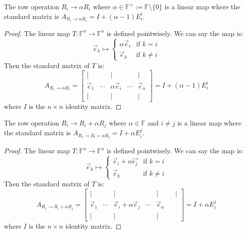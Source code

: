 \documentclass[
	11pt, %
	fleqn, %
	a4paper, %
]{LegrandOrangeBook}
\newcommand{\F}{\mathbb{F}} %
\begin{document}
\begin{proposition}
    The row operation $R_i \to \alpha R_i$ where $\alpha \in \F^{\times} := \F \setminus \{0\}$ is a linear map where the standard matrix is $A_{R_i \to \alpha R_i} = I + (\alpha - 1) E_i^i$.
\end{proposition}

\begin{proof}
    The linear map $T: \F^n \to \F^n$ is defined pointwisely. We can say the map is:
    \[
        \vec{e}_k \mapsto \begin{cases}
            \alpha \vec{e}_i & \text{if } k = i \\
            \vec{e}_k & \text{if } k \neq i
        \end{cases}
    \]
    Then the standard matrix of $T$ is:
    \[
        A_{R_i \to \alpha R_i} = \begin{bmatrix}
            | & & | & & | \\
            \vec{e}_1 & \cdots & \alpha\vec{e}_i & \cdots & \vec{e}_n \\
            | & & | & & |
        \end{bmatrix} = I + (\alpha - 1) E_i^i
    \]
    where $I$ is the $n \times n$ identity matrix.
\end{proof}

\begin{proposition}
    The row operation $R_i \to R_i + \alpha R_j$ where $\alpha \in \F$ and $i \neq j$ is a linear map where the standard matrix is $A_{R_i \to R_i + \alpha R_j} = I + \alpha E_i^j$.
\end{proposition}

\begin{proof}
    The linear map $T: \F^n \to \F^n$ is defined pointwisely. We can say the map is:
    \[
        \vec{e}_k \mapsto \begin{cases}
            \vec{e}_i + \alpha \vec{e_j} & \text{if } k = i \\
            \vec{e}_k & \text{if } k \neq i
        \end{cases}
    \]
    Then the standard matrix of $T$ is:
    \[
        A_{R_i \to R_i + \alpha R_j} = \begin{bmatrix}
            | & & | & & | & & | \\
            \vec{e}_1 & \cdots & \vec{e}_i + \alpha\vec{e}_j & \cdots & \vec{e}_n \\
            | & & | & & |
        \end{bmatrix} = I + \alpha E_i^j
    \]
    where $I$ is the $n \times n$ identity matrix.
\end{proof}
\end{document}
